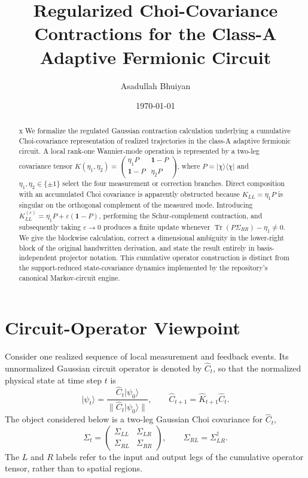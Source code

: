 \documentclass[aps,prb,onecolumn,nofootinbib,superscriptaddress]{revtex4-2}
\newcommand{\I}{\mathbf{1}}
\newcommand{\Tr}{\operatorname{Tr}}
\newcommand{\ket}[1]{\lvert #1\rangle}
\newcommand{\bra}[1]{\langle #1\rvert}
\newcommand{\eps}{\varepsilon}
\theoremstyle{plain}
\theoremstyle{definition}
\begin{document}
\title{Regularized Choi-Covariance Contractions for the Class-A Adaptive Fermionic Circuit}
\author{Asadullah Bhuiyan}
\date{\today}

\begin{abstract}x
We formalize the regulated Gaussian contraction calculation underlying a
cumulative Choi-covariance representation of realized trajectories in the
class-A adaptive fermionic circuit.  A local rank-one Wannier-mode operation is
represented by a two-leg covariance tensor
\(
K(\eta_1,\eta_2)
=
\left(\begin{smallmatrix}
\eta_1P & \I-P\\
\I-P & \eta_2P
\end{smallmatrix}\right)
\),
where \(P=\ket{\chi}\bra{\chi}\) and
\(\eta_1,\eta_2\in\{\pm1\}\) select the four measurement or correction
branches.  Direct composition with an accumulated Choi covariance is
apparently obstructed because \(K_{LL}=\eta_1P\) is singular on the
orthogonal complement of the measured mode.  Introducing
\(K_{LL}^{(\eps)}=\eta_1P+\eps(\I-P)\), performing the Schur-complement
contraction, and subsequently taking \(\eps\to0\) produces a finite update
whenever
\(
\Tr(P\Sigma_{RR})-\eta_1\neq0
\).
We give the blockwise calculation, correct a dimensional ambiguity in the
lower-right block of the original handwritten derivation, and state the
result entirely in basis-independent projector notation.  This cumulative
operator construction is distinct from the support-reduced state-covariance
dynamics implemented by the repository's canonical Markov-circuit engine.
\end{abstract}

\maketitle
\tableofcontents

\section{Circuit-Operator Viewpoint}

Consider one realized sequence of local measurement and feedback events.  Its
unnormalized Gaussian circuit operator is denoted by \(\hat C_t\), so that the
normalized physical state at time step \(t\) is
\begin{equation}
  \ket{\psi_t}
  =
  \frac{\hat C_t\ket{\psi_0}}
       {\|\hat C_t\ket{\psi_0}\|},
  \qquad
  \hat C_{t+1}=\hat K_{t+1}\hat C_t .
  \label{eq:operator-trajectory}
\end{equation}
The object considered below is a two-leg Gaussian Choi covariance for
\(\hat C_t\),
\begin{equation}
  \Sigma_t
  =
  \begin{pmatrix}
    \Sigma_{LL} & \Sigma_{LR}\\
    \Sigma_{RL} & \Sigma_{RR}
  \end{pmatrix},
  \qquad
  \Sigma_{RL}=\Sigma_{LR}^{\dagger}.
  \label{eq:Sigma-blocks}
\end{equation}
The \(L\) and \(R\) labels refer to the input and output legs of the
cumulative operator tensor, rather than to spatial regions.
\end{document}
